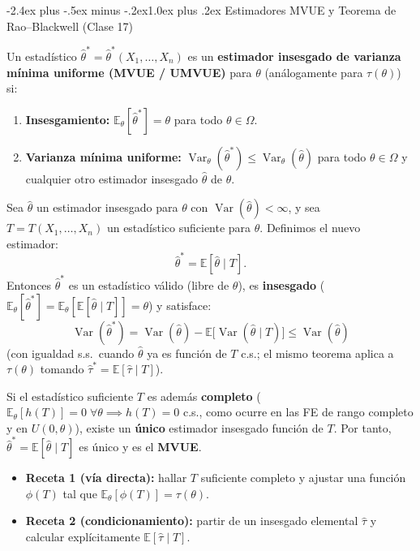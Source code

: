 \documentclass[10pt,a4paper]{article}
\makeatletter
\newcommand{\E}{\mathbb{E}}
\newcommand{\Var}{\operatorname{Var}}
\renewcommand\section{\@startsection{section}{1}{0pt}%
  {-2.4ex plus -.5ex minus -.2ex}{1.0ex plus .2ex}%
  {\normalfont\large\bfseries\color{seccolor}}}
\makeatother
\begin{document}
\section{Estimadores MVUE y Teorema de Rao--Blackwell \textmd{(Clase 17)}}

\begin{defbox}[frametitle={Definición · Estimador MVUE / UMVUE}]
Un estadístico $\hat\theta^* = \hat\theta^*(X_1, \dots, X_n)$ es un \textbf{estimador insesgado de varianza mínima uniforme (MVUE / UMVUE)} para $\theta$ (análogamente para $\tau(\theta)$) si:
\begin{enumerate}
  \item \textbf{Insesgamiento:} $\E_\theta[\hat\theta^*] = \theta$ para todo $\theta \in \Omega$.
  \item \textbf{Varianza mínima uniforme:} $\Var_\theta(\hat\theta^*) \le \Var_\theta(\hat\theta)$ para todo $\theta \in \Omega$ y cualquier otro estimador insesgado $\hat\theta$ de $\theta$.
\end{enumerate}
\end{defbox}

\begin{thmbox}[frametitle={Teorema de Rao--Blackwell}]
Sea $\hat\theta$ un estimador insesgado para $\theta$ con $\Var(\hat\theta) < \infty$, y sea $T = T(X_1, \dots, X_n)$ un estadístico suficiente para $\theta$. Definimos el nuevo estimador:
\[
\hat\theta^* = \E[\hat\theta \mid T].
\]
Entonces $\hat\theta^*$ es un estadístico válido (libre de $\theta$), es \textbf{insesgado} ($\E_\theta[\hat\theta^*] = \E_\theta[\E[\hat\theta \mid T]] = \theta$) y satisface:
\[
\Var(\hat\theta^*) = \Var(\hat\theta) - \E\big[\Var(\hat\theta \mid T)\big] \le \Var(\hat\theta)
\]
(con igualdad s.s.\ cuando $\hat\theta$ ya es función de $T$ c.s.; el mismo teorema aplica a $\tau(\theta)$ tomando $\hat\tau^* = \E[\hat\tau \mid T]$).
\end{thmbox}

\begin{notebox}[frametitle={Teorema de Lehmann--Scheffé (completitud y dos recetas prácticas)}]
Si el estadístico suficiente $T$ es además \textbf{completo} ($\E_\theta[h(T)] = 0\;\forall\theta \implies h(T) = 0$ c.s., como ocurre en las FE de rango completo y en $U(0,\theta)$), existe un \textbf{único} estimador insesgado función de $T$. Por tanto, $\hat\theta^* = \E[\hat\theta \mid T]$ es único y es el \textbf{MVUE}.
\begin{itemize}
  \item \textbf{Receta 1 (vía directa):} hallar $T$ suficiente completo y ajustar una función $\phi(T)$ tal que $\E_\theta[\phi(T)] = \tau(\theta)$.
  \item \textbf{Receta 2 (condicionamiento):} partir de un insesgado elemental $\hat\tau$ y calcular explícitamente $\E[\hat\tau \mid T]$.
\end{itemize}
\end{notebox}
\end{document}
